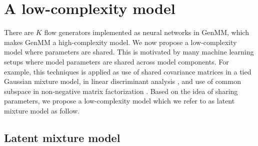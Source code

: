 \section{A low-complexity model}
There are $K$ flow generators implemented as neural networks in GenMM, which makes GenMM a high-complexity model.
We now propose a low-complexity model where parameters are shared. This is motivated by many machine learning setups where model parameters are shared across model components. For example, this techniques is applied as use of shared covariance matrices in a tied Gaussian mixture model, in linear discriminant analysis \cite{bellegarda1990tiedmixture, Kimball:1993:UTD:1075671.1075694, Bishop:2006:PRM:1162264}, and use of common subspace in non-negative matrix factorization \cite{Gupta2013}. Based on the idea of sharing parameters, we propose a low-complexity model which we refer to as latent mixture model as follow.

\subsection{Latent mixture model}\label{subsec-latmm}

